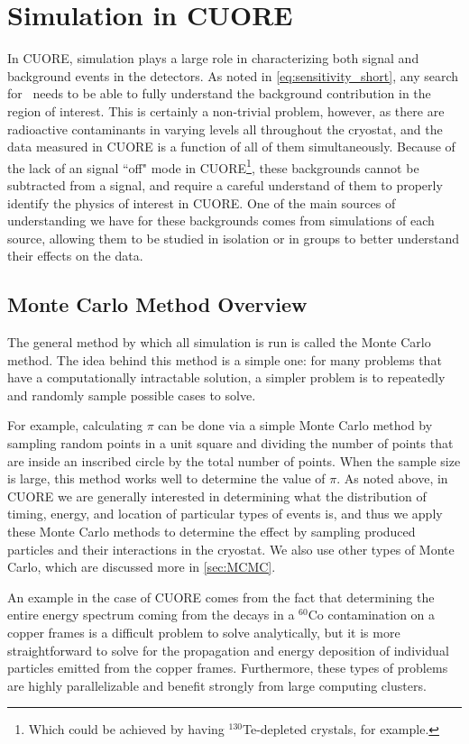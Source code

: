 \chapter{Simulation in CUORE}
\label{ch:Simulation in CUORE}

In CUORE, simulation plays a large role in characterizing both signal and background events in the detectors.
As noted in \autoref{eq:sensitivity_short}, any search for \zeronubb~needs to be able to fully understand the background contribution in the region of interest.
This is certainly a non-trivial problem, however, as there are radioactive contaminants in varying levels all throughout the cryostat, and the data measured in CUORE is a function of all of them simultaneously.
Because of the lack of an signal ``off" mode in CUORE\footnote{Which could be achieved by having $^{130}$Te-depleted crystals, for example.}, these backgrounds cannot be subtracted from a signal, and require a careful understand of them to properly identify the physics of interest in CUORE.
One of the main sources of understanding we have for these backgrounds comes from simulations of each source, allowing them to be studied in isolation or in groups to better understand their effects on the data.
\section{Monte Carlo Method Overview}
The general method by which all simulation is run is called the Monte Carlo method.
The idea behind this method is a simple one: for many problems that have a computationally intractable solution, a simpler problem is to repeatedly and randomly sample possible cases to solve.

For example, calculating $\pi$ can be done via a simple Monte Carlo method by sampling random points in a unit square and dividing the number of points that are inside an inscribed circle by the total number of points.
When the sample size is large, this method works well to determine the value of $\pi$.
As noted above, in CUORE we are generally interested in determining what the distribution of timing, energy, and location of particular types of events is, and thus we apply these Monte Carlo methods to determine the effect by sampling produced particles and their interactions in the cryostat.
We also use other types of Monte Carlo, which are discussed more in \autoref{sec:MCMC}.

An example in the case of CUORE comes from the fact that determining the entire energy spectrum coming from the decays in a $^{60}\textrm{Co}$ contamination on a copper frames is a difficult problem to solve analytically, but it is more straightforward to solve for the propagation and energy deposition of individual particles emitted from the copper frames.
Furthermore, these types of problems are highly parallelizable and benefit strongly from large computing clusters.

